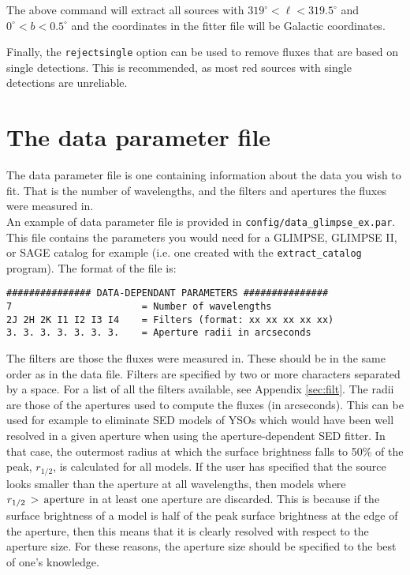 \documentclass[letterpaper,11pt]{report}
\begin{document}
The above command will extract all sources with $319^\circ < \ell < 319.5^\circ$ and $0^\circ < b <0.5^\circ$ and the coordinates in the fitter file will be Galactic coordinates.

Finally, the \texttt{rejectsingle} option can be used to remove fluxes that are based on single detections. This is recommended, as most red sources with single detections are unreliable.

\section{The data parameter file}

\label{sec:aperture}

The data parameter file is one containing information about the data you wish to fit. That is the number of wavelengths, and the filters and apertures the fluxes were measured in.\\

An example of data parameter file is provided in \texttt{config/data\_glimpse\_ex.par}. This file contains the parameters you would need for a GLIMPSE, GLIMPSE II, or SAGE catalog for example (i.e. one created with the \texttt{extract\_catalog} program). The format of the file is:

\begin{verbatim}
############### DATA-DEPENDANT PARAMETERS ###############
7                       = Number of wavelengths
2J 2H 2K I1 I2 I3 I4    = Filters (format: xx xx xx xx xx)
3. 3. 3. 3. 3. 3. 3.    = Aperture radii in arcseconds
\end{verbatim}

The filters are those the fluxes were measured in. These should be in the same order as in the data file. Filters are specified by two or more characters separated by a space. For a list of all the filters available, see Appendix  \ref{sec:filt}. The radii are those of the apertures used to compute the fluxes (in arcseconds). This can be used for example to eliminate SED models of YSOs which would have been well resolved in a given aperture when using the aperture-dependent SED fitter. In that case, the outermost radius at which the surface brightness falls to 50\% of the peak, $r_{1/2}$, is calculated for all models. If the user has specified that the source looks smaller than the aperture at all wavelengths, then models where $r_{1/2}\,>\,{\rm aperture}$ in at least one aperture are discarded. This is because if the surface brightness of a model is half of the peak surface brightness at the edge of the aperture, then this means that it is clearly resolved with respect to the aperture size. For these reasons, the aperture size should be specified to the best of one's knowledge.
\end{document}
